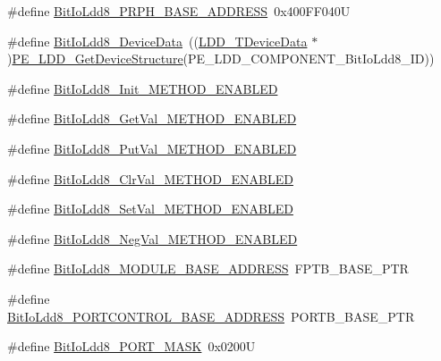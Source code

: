 \begin{DoxyCompactItemize}
\item 
\#define \hyperlink{group___bit_io_ldd8__module_ga09482d5a10100fd29f0e827951b8fc01}{Bit\-Io\-Ldd8\-\_\-\-P\-R\-P\-H\-\_\-\-B\-A\-S\-E\-\_\-\-A\-D\-D\-R\-E\-S\-S}~0x400\-F\-F040\-U
\item 
\#define \hyperlink{group___bit_io_ldd8__module_gaaf5f55b3173b9117dba16e493f8a9649}{Bit\-Io\-Ldd8\-\_\-\-Device\-Data}~((\hyperlink{group___p_e___types__module_gac5cf1362f1f0e3a2ce71b1bf2276d091}{L\-D\-D\-\_\-\-T\-Device\-Data} $\ast$)\hyperlink{group___p_e___types__module_gaa1c23d559daef5bcd3327ca83fb56f5a}{P\-E\-\_\-\-L\-D\-D\-\_\-\-Get\-Device\-Structure}(P\-E\-\_\-\-L\-D\-D\-\_\-\-C\-O\-M\-P\-O\-N\-E\-N\-T\-\_\-\-Bit\-Io\-Ldd8\-\_\-\-I\-D))
\item 
\#define \hyperlink{group___bit_io_ldd8__module_ga2c2922a78e0b56ad866bc53e4a588268}{Bit\-Io\-Ldd8\-\_\-\-Init\-\_\-\-M\-E\-T\-H\-O\-D\-\_\-\-E\-N\-A\-B\-L\-E\-D}
\item 
\#define \hyperlink{group___bit_io_ldd8__module_gac6e8c62854f6719a895f0efaaf7534ae}{Bit\-Io\-Ldd8\-\_\-\-Get\-Val\-\_\-\-M\-E\-T\-H\-O\-D\-\_\-\-E\-N\-A\-B\-L\-E\-D}
\item 
\#define \hyperlink{group___bit_io_ldd8__module_gad7ea4f5b4b346db77cc2653efbc04979}{Bit\-Io\-Ldd8\-\_\-\-Put\-Val\-\_\-\-M\-E\-T\-H\-O\-D\-\_\-\-E\-N\-A\-B\-L\-E\-D}
\item 
\#define \hyperlink{group___bit_io_ldd8__module_ga7515b772c73208577cb2d18ac1ff258f}{Bit\-Io\-Ldd8\-\_\-\-Clr\-Val\-\_\-\-M\-E\-T\-H\-O\-D\-\_\-\-E\-N\-A\-B\-L\-E\-D}
\item 
\#define \hyperlink{group___bit_io_ldd8__module_ga7f108603964f8b44faa308a4252fe326}{Bit\-Io\-Ldd8\-\_\-\-Set\-Val\-\_\-\-M\-E\-T\-H\-O\-D\-\_\-\-E\-N\-A\-B\-L\-E\-D}
\item 
\#define \hyperlink{group___bit_io_ldd8__module_ga219b52b3c1831172178c214a9b248663}{Bit\-Io\-Ldd8\-\_\-\-Neg\-Val\-\_\-\-M\-E\-T\-H\-O\-D\-\_\-\-E\-N\-A\-B\-L\-E\-D}
\item 
\#define \hyperlink{group___bit_io_ldd8__module_ga28519aa1da0a97a4120530946afb081a}{Bit\-Io\-Ldd8\-\_\-\-M\-O\-D\-U\-L\-E\-\_\-\-B\-A\-S\-E\-\_\-\-A\-D\-D\-R\-E\-S\-S}~F\-P\-T\-B\-\_\-\-B\-A\-S\-E\-\_\-\-P\-T\-R
\item 
\#define \hyperlink{group___bit_io_ldd8__module_ga39ba5530dac14c9d48eefd95396558bd}{Bit\-Io\-Ldd8\-\_\-\-P\-O\-R\-T\-C\-O\-N\-T\-R\-O\-L\-\_\-\-B\-A\-S\-E\-\_\-\-A\-D\-D\-R\-E\-S\-S}~P\-O\-R\-T\-B\-\_\-\-B\-A\-S\-E\-\_\-\-P\-T\-R
\item 
\#define \hyperlink{group___bit_io_ldd8__module_gaecff2d7d7f545c5088a1e9281bb2945f}{Bit\-Io\-Ldd8\-\_\-\-P\-O\-R\-T\-\_\-\-M\-A\-S\-K}~0x0200\-U
\end{DoxyCompactItemize}
